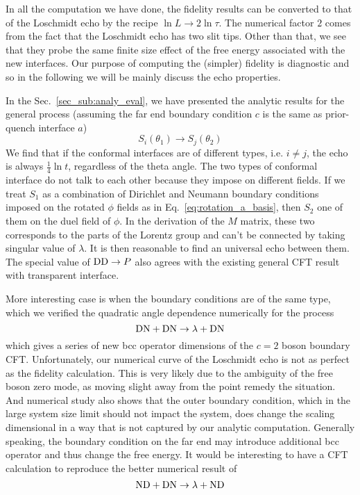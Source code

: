 

In all the computation we have done, the fidelity results can be converted to that of the Loschmidt echo by the recipe $ \ln L \rightarrow 2 \ln \tau$. The numerical factor $2$ comes from the fact that the Loschmidt echo has two slit tips. Other than that, we see that they probe the same finite size effect of the free energy associated with the new interfaces. Our purpose of computing the (simpler) fidelity is diagnostic and so in the following we will be mainly discuss the echo properties. 

In the Sec.~\ref{sec_sub:analy_eval}, we have presented the analytic results for the general process (assuming the far end boundary condition $c$ is the same as prior-quench interface $a$) 
\begin{equation}
 S_i( \theta_1 ) \rightarrow S_j( \theta_2 )
\end{equation}
We find that if the conformal interfaces are of different types, i.e. $i \ne j$, the echo is always $\frac{1}{4} \ln t$, regardless of the theta angle. The two types of conformal interface do not talk to each other because they impose on different fields. If we treat $S_1$ as a combination of Dirichlet and Neumann boundary conditions imposed on the rotated $\phi$ fields as in Eq.~\eqref{eq:rotation_a_basis}, then $S_2$ one of them on the duel field of $\phi$. In the derivation of the $M$ matrix, these two corresponds to the parts of the Lorentz group and can't be connected by taking singular value of $\lambda$. It is then reasonable to find an universal echo between them. The special value of ${\rm DD} \rightarrow P$ also agrees with the existing general CFT result with transparent interface\cite{stephan_logarithmic_2013,stephan_local_2011,vasseur_universal_2014,vasseur_crossover_2013,kennes_universal_2014}. 


More interesting case is when the boundary conditions are of the same type, which we verified the quadratic angle dependence numerically for the process 
\begin{equation}
{\rm DN} + {\rm DN} \rightarrow \lambda + {\rm DN} 
\end{equation}
which gives a series of new bcc operator dimensions of the $c = 2$ boson boundary CFT. Unfortunately, our numerical curve of the Loschmidt echo is not as perfect as the fidelity calculation. This is very likely due to the ambiguity of the free boson zero mode, as moving slight away from the point remedy the situation. And numerical study also shows that the outer boundary condition, which in the large system size limit should not impact the system, does change the scaling dimensional in a way that is not captured by our analytic computation. Generally speaking, the boundary condition on the far end may introduce additional bcc operator and thus change the free energy. It would be interesting to have a CFT calculation to reproduce the better numerical result of
\begin{equation}
{\rm ND} + {\rm DN} \rightarrow \lambda + {\rm ND} 
\end{equation}

